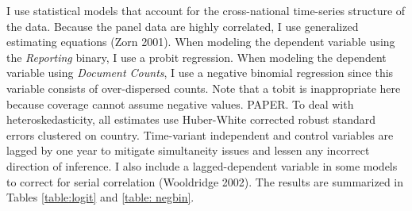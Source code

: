 \documentclass[11pt, oneside]{article}
\begin{document}
I use statistical models that account for the cross-national time-series structure of the data. Because the panel data are highly correlated, I use generalized estimating equations (Zorn 2001). When modeling the dependent variable using the \emph{Reporting} binary, I use a probit regression. When modeling the dependent variable using \emph{Document Counts}, I use a negative binomial regression since this variable consists of over-dispersed counts. Note that a tobit is inappropriate here because coverage cannot assume negative values. PAPER. To deal with heteroskedasticity, all estimates use Huber-White corrected robust standard errors clustered on country.  Time-variant independent and control variables are lagged by one year to mitigate simultaneity issues and lessen any incorrect direction of inference. I also include a lagged-dependent variable in some models to correct for serial correlation (Wooldridge 2002). The results are summarized in Tables \ref{table:logit} and \ref{table: negbin}.
\end{document}
